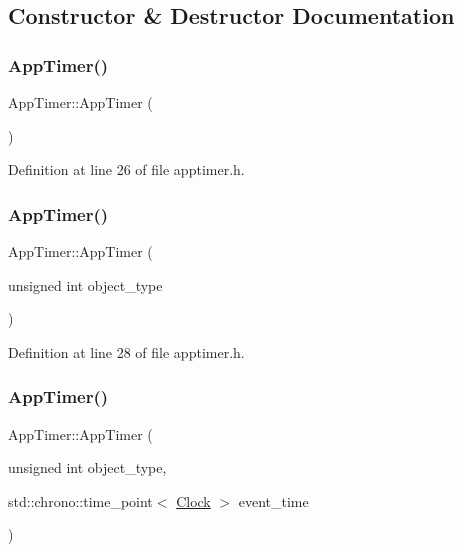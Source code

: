 \subsection{Constructor \& Destructor Documentation}
\mbox{\label{class_app_timer_a59bf4eccdc9a3e16745b2cf9a122f935}} 
\subsubsection{\texorpdfstring{App\+Timer()}{AppTimer()}\hspace{0.1cm}{\footnotesize\ttfamily [1/4]}}
{\footnotesize\ttfamily App\+Timer\+::\+App\+Timer (\begin{DoxyParamCaption}{ }\end{DoxyParamCaption})\hspace{0.3cm}{\ttfamily [inline]}}



Definition at line 26 of file apptimer.\+h.

\mbox{\label{class_app_timer_a06df15e33135f60f661c231e067951f3}} 
\subsubsection{\texorpdfstring{App\+Timer()}{AppTimer()}\hspace{0.1cm}{\footnotesize\ttfamily [2/4]}}
{\footnotesize\ttfamily App\+Timer\+::\+App\+Timer (\begin{DoxyParamCaption}\item[{unsigned int}]{object\+\_\+type }\end{DoxyParamCaption})\hspace{0.3cm}{\ttfamily [inline]}}



Definition at line 28 of file apptimer.\+h.

\mbox{\label{class_app_timer_a192075895ca575e9acb2663f3ebcecd6}} 
\subsubsection{\texorpdfstring{App\+Timer()}{AppTimer()}\hspace{0.1cm}{\footnotesize\ttfamily [3/4]}}
{\footnotesize\ttfamily App\+Timer\+::\+App\+Timer (\begin{DoxyParamCaption}\item[{unsigned int}]{object\+\_\+type,  }\item[{std\+::chrono\+::time\+\_\+point$<$ \mbox{\hyperlink{universe_8h_a0ef8d951d1ca5ab3cfaf7ab4c7a6fd80}{Clock}} $>$}]{event\+\_\+time }\end{DoxyParamCaption})\hspace{0.3cm}{\ttfamily [inline]}}




